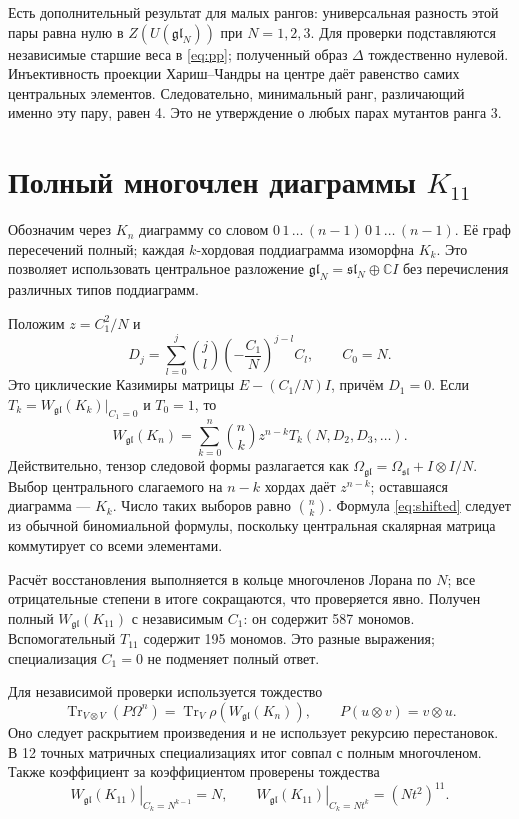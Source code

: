 \documentclass[11pt,a4paper]{article}
\numberwithin{equation}{section}
\theoremstyle{definition}
\theoremstyle{remark}
\newcommand{\gl}{\mathfrak{gl}}
\newcommand{\sll}{\mathfrak{sl}}
\newcommand{\W}{W_{\gl}}
\newcommand{\Tr}{\operatorname{Tr}}
\begin{document}
Есть дополнительный результат для малых рангов: универсальная
разность этой пары равна нулю в $Z(U(\gl_N))$ при $N=1,2,3$.
Для проверки подставляются независимые старшие веса в
\eqref{eq:pp}; полученный образ $\Delta$ тождественно нулевой.
Инъективность проекции Хариш--Чандры на центре даёт равенство
самих центральных элементов. Следовательно, минимальный ранг,
различающий именно эту пару, равен 4. Это не утверждение о любых
парах мутантов ранга 3.

\section{\texorpdfstring{Полный многочлен диаграммы $K_{11}$}{Полный многочлен диаграммы K11}}
\label{sec:complete}

Обозначим через $K_n$ диаграмму со словом
$0\,1\,\ldots\,(n-1)\,0\,1\,\ldots\,(n-1)$.
Её граф пересечений полный; каждая $k$-хордовая поддиаграмма
изоморфна $K_k$. Это позволяет использовать центральное разложение
$\gl_N=\sll_N\oplus\mathbb C I$ без перечисления различных типов
поддиаграмм.

Положим $z=C_1^2/N$ и
\begin{equation}\label{eq:shifted}
 D_j=\sum_{l=0}^{j}\binom jl
 \left(-\frac{C_1}{N}\right)^{j-l}C_l,\qquad C_0=N.
\end{equation}
Это циклические Казимиры матрицы $E-(C_1/N)I$, причём $D_1=0$.
Если $T_k=\W(K_k)|_{C_1=0}$ и $T_0=1$, то
\begin{equation}\label{eq:complete}
 \W(K_n)=\sum_{k=0}^n\binom nk z^{n-k}
 T_k(N,D_2,D_3,\ldots).
\end{equation}
Действительно, тензор следовой формы разлагается как
$\Omega_{\gl}=\Omega_{\sll}+I\otimes I/N$.
Выбор центрального слагаемого на $n-k$ хордах даёт $z^{n-k}$;
оставшаяся диаграмма --- $K_k$. Число таких выборов равно $\binom nk$.
Формула \eqref{eq:shifted} следует из обычной биномиальной формулы,
поскольку центральная скалярная матрица коммутирует со всеми элементами.

Расчёт восстановления выполняется в кольце многочленов Лорана по $N$;
все отрицательные степени в итоге сокращаются, что проверяется явно.
Получен полный $\W(K_{11})$ с независимым $C_1$: он содержит
587 мономов. Вспомогательный $T_{11}$ содержит 195 мономов.
Это разные выражения; специализация $C_1=0$ не подменяет полный ответ.

Для независимой проверки используется тождество
\[
 \Tr_{V\otimes V}(P\Omega^n)=\Tr_V\rho(\W(K_n)),
 \qquad P(u\otimes v)=v\otimes u.
\]
Оно следует раскрытием произведения и не использует рекурсию перестановок.
В 12 точных матричных специализациях итог совпал с полным многочленом.
Также коэффициент за коэффициентом проверены тождества
\[
 \left.\W(K_{11})\right|_{C_k=N^{k-1}}=N,\qquad
 \left.\W(K_{11})\right|_{C_k=Nt^k}=(Nt^2)^{11}.
\]
\end{document}
